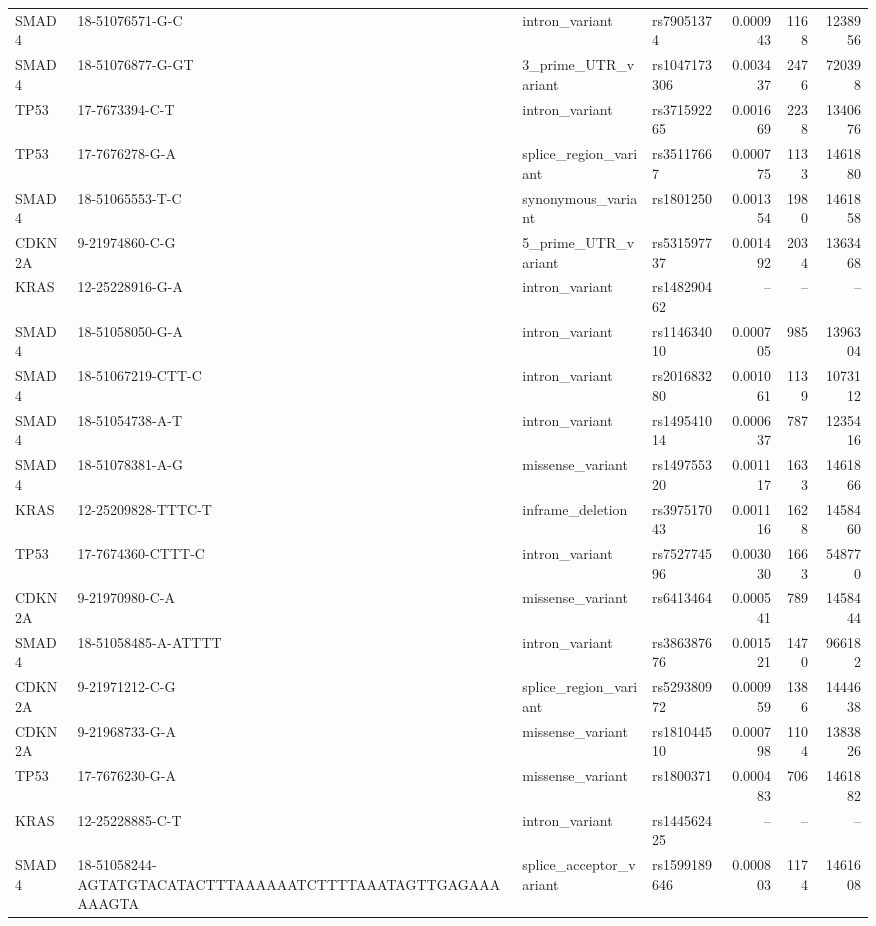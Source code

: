 \begin{footnotesize}
\begin{longtable}{llllrrr}
SMAD4 & 18-51076571-G-C & intron\_variant & rs79051374 & 0.000943 & 1168 & 1238956 \\
SMAD4 & 18-51076877-G-GT & 3\_prime\_UTR\_variant & rs1047173306 & 0.003437 & 2476 & 720398 \\
TP53 & 17-7673394-C-T & intron\_variant & rs371592265 & 0.001669 & 2238 & 1340676 \\
TP53 & 17-7676278-G-A & splice\_region\_variant & rs35117667 & 0.000775 & 1133 & 1461880 \\
SMAD4 & 18-51065553-T-C & synonymous\_variant & rs1801250 & 0.001354 & 1980 & 1461858 \\
CDKN2A & 9-21974860-C-G & 5\_prime\_UTR\_variant & rs531597737 & 0.001492 & 2034 & 1363468 \\
KRAS & 12-25228916-G-A & intron\_variant & rs148290462 & -- & -- & -- \\
SMAD4 & 18-51058050-G-A & intron\_variant & rs114634010 & 0.000705 & 985 & 1396304 \\
SMAD4 & 18-51067219-CTT-C & intron\_variant & rs201683280 & 0.001061 & 1139 & 1073112 \\
SMAD4 & 18-51054738-A-T & intron\_variant & rs149541014 & 0.000637 & 787 & 1235416 \\
SMAD4 & 18-51078381-A-G & missense\_variant & rs149755320 & 0.001117 & 1633 & 1461866 \\
KRAS & 12-25209828-TTTC-T & inframe\_deletion & rs397517043 & 0.001116 & 1628 & 1458460 \\
TP53 & 17-7674360-CTTT-C & intron\_variant & rs752774596 & 0.003030 & 1663 & 548770 \\
CDKN2A & 9-21970980-C-A & missense\_variant & rs6413464 & 0.000541 & 789 & 1458444 \\
SMAD4 & 18-51058485-A-ATTTT & intron\_variant & rs386387676 & 0.001521 & 1470 & 966182 \\
CDKN2A & 9-21971212-C-G & splice\_region\_variant & rs529380972 & 0.000959 & 1386 & 1444638 \\
CDKN2A & 9-21968733-G-A & missense\_variant & rs181044510 & 0.000798 & 1104 & 1383826 \\
TP53 & 17-7676230-G-A & missense\_variant & rs1800371 & 0.000483 & 706 & 1461882 \\
KRAS & 12-25228885-C-T & intron\_variant & rs144562425 & -- & -- & -- \\
SMAD4 & 18-51058244-AGTATGTACATACTTTAAAAAATCTTTTAAATAGTTGAGAAAAAAGTA & splice\_acceptor\_variant & rs1599189646 & 0.000803 & 1174 & 1461608 \\

\end{longtable}
\end{footnotesize}
